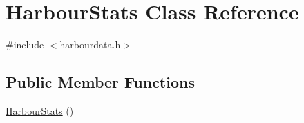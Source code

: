 \hypertarget{class_harbour_stats}{}\section{Harbour\+Stats Class Reference}
\label{class_harbour_stats}


{\ttfamily \#include $<$harbourdata.\+h$>$}

\subsection*{Public Member Functions}
\begin{DoxyCompactItemize}
\item 
\mbox{\hyperlink{class_harbour_stats_aa523ef633e9af7cc6830b08afa79eca8}{Harbour\+Stats}} ()
\end{DoxyCompactItemize}
